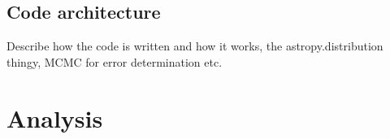 \documentclass{aastex63}
\newcommand\aastex{AAS\TeX}
\begin{document}
%
%
%
%
%
%
%
%

\subsection{Code architecture}
\label{subsec:code}

Describe how the code is written and how it works, the astropy.distribution thingy, MCMC for error determination etc.

\section{Analysis} 
\label{sec:analysis}
\end{document}
